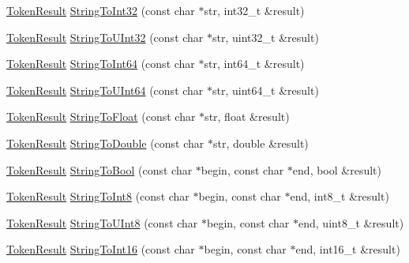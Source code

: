 \begin{DoxyCompactItemize}
\item 
\hyperlink{namespacemage_a2178ba2411db5912f41b2e7698c2037d}{Token\+Result} \hyperlink{namespacemage_a805f1cf7436782f77b49085194451d07}{String\+To\+Int32} (const char $\ast$str, int32\+\_\+t \&result)
\item 
\hyperlink{namespacemage_a2178ba2411db5912f41b2e7698c2037d}{Token\+Result} \hyperlink{namespacemage_ac4f6357454f6870506e0fc102b745281}{String\+To\+U\+Int32} (const char $\ast$str, uint32\+\_\+t \&result)
\item 
\hyperlink{namespacemage_a2178ba2411db5912f41b2e7698c2037d}{Token\+Result} \hyperlink{namespacemage_a9134bbf3717893628e324fcf83e203a0}{String\+To\+Int64} (const char $\ast$str, int64\+\_\+t \&result)
\item 
\hyperlink{namespacemage_a2178ba2411db5912f41b2e7698c2037d}{Token\+Result} \hyperlink{namespacemage_a9ed31e3340a769a654f1f819c368bb6d}{String\+To\+U\+Int64} (const char $\ast$str, uint64\+\_\+t \&result)
\item 
\hyperlink{namespacemage_a2178ba2411db5912f41b2e7698c2037d}{Token\+Result} \hyperlink{namespacemage_a9353f738019573cfa93e504978bf6584}{String\+To\+Float} (const char $\ast$str, float \&result)
\item 
\hyperlink{namespacemage_a2178ba2411db5912f41b2e7698c2037d}{Token\+Result} \hyperlink{namespacemage_a49403be4dcbd136ffb13f62669576c50}{String\+To\+Double} (const char $\ast$str, double \&result)
\item 
\hyperlink{namespacemage_a2178ba2411db5912f41b2e7698c2037d}{Token\+Result} \hyperlink{namespacemage_a5deef7799d080b8c98c9ead54fbcb6db}{String\+To\+Bool} (const char $\ast$begin, const char $\ast$end, bool \&result)
\item 
\hyperlink{namespacemage_a2178ba2411db5912f41b2e7698c2037d}{Token\+Result} \hyperlink{namespacemage_a0bd81bf259563dd9de793ada42405c95}{String\+To\+Int8} (const char $\ast$begin, const char $\ast$end, int8\+\_\+t \&result)
\item 
\hyperlink{namespacemage_a2178ba2411db5912f41b2e7698c2037d}{Token\+Result} \hyperlink{namespacemage_ae6af1c0b282e0858fe4376325b4d06c6}{String\+To\+U\+Int8} (const char $\ast$begin, const char $\ast$end, uint8\+\_\+t \&result)
\item 
\hyperlink{namespacemage_a2178ba2411db5912f41b2e7698c2037d}{Token\+Result} \hyperlink{namespacemage_aa993ba23b5023902c29ecbe9b0d7a954}{String\+To\+Int16} (const char $\ast$begin, const char $\ast$end, int16\+\_\+t \&result)
\item 

\end{DoxyCompactItemize}
